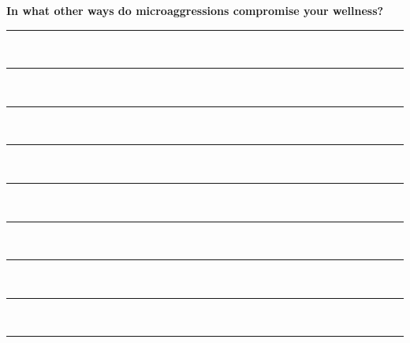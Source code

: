 \newpage
\noindent
\textcolor{ProcessBlue}{\textbf{\Large{In what other ways do microaggressions compromise your wellness?}}}\\
\noindent\rule{\textwidth}{1pt}\\
\noindent\rule{\textwidth}{1pt}\\
\noindent\rule{\textwidth}{1pt}\\
\noindent\rule{\textwidth}{1pt}\\
\noindent\rule{\textwidth}{1pt}\\
\noindent\rule{\textwidth}{1pt}\\
\noindent\rule{\textwidth}{1pt}\\
\noindent\rule{\textwidth}{1pt}\\
\noindent\rule{\textwidth}{1pt}\\\\

